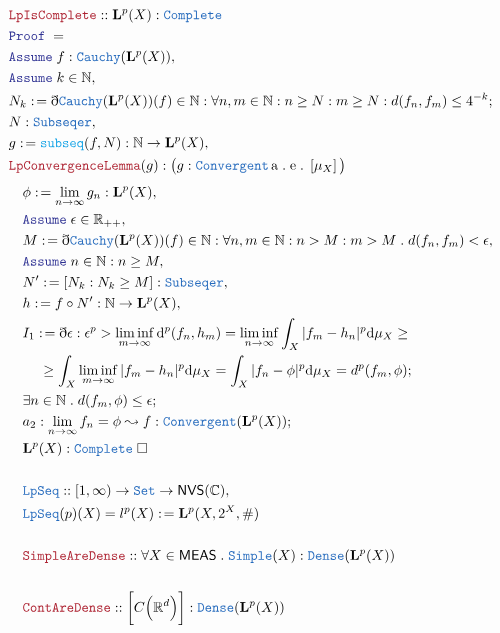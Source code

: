 \documentclass[12pt]{article}
\newcommand{\TYPE}[1]{\textcolor{NavyBlue}{\mathtt{#1}}}
\newcommand{\FUNC}[1]{\textcolor{Cerulean}{\mathtt{#1}}}
\newcommand{\LOGIC}[1]{\textcolor{Blue}{\mathtt{#1}}}
\newcommand{\THM}[1]{\textcolor{Maroon}{\mathtt{#1}}}
\renewcommand{\.}{\; . \;}
\newcommand{\de}{: \kern 0.1pc =}
\newcommand{\NewLine}{\\ & \kern 1pc}
\newcommand{\Reals}{\mathbb{R} }
\newcommand{\Nat}{\mathbb{N} }
\newcommand{\Co}{\mathbb{C} }
\newcommand{\Set}{\TYPE{Set}}
\newcommand{\A}{\LOGIC{Assume} \;}
\newcommand{\QED}{\; \square}
\newcommand{\ByDef}{\eth}
\newcommand{\Proof}{\LOGIC{Proof} \; }
\renewcommand{\AE}[1]{\mathrm{a\. e\.} \left[#1\right]}
\newcommand{\Lp}{\mathbf{L}}
\begin{document}
\begin{align*}
 \\   \\
&\THM{LpIsComplete} :: \Lp^p(X) : \TYPE{Complete} \\
&   \Proof =     \\
&   \A f : \TYPE{Cauchy}(\Lp^p(X)),\\
&    \A k \in \Nat, \\
&     N_k \de \ByDef\TYPE{Cauchy}(\Lp^p(X))(f) \in \Nat : \forall n,m \in \Nat : n \ge N : m \ge N : d(f_n,f_m) \le  4^{-k};\\
&  N : \TYPE{Subseqer}                  ,\\ 
&  g \de \FUNC{subseq}(f,N) : \Nat \to \Lp^p(X), \\
&  \THM{LpConvergenceLemma}(g) : \big( g : \TYPE{Convergent} \, \AE{\mu_X} \big) \\
\end{align*}
\newpage    
\begin{align*}
&  \phi \de \lim_{n \to \infty} g_n : \Lp^p(X),                         \\
&  \A \epsilon \in \Reals_{++},  \\
&  M \de \ByDef\TYPE{Cauchy}(\Lp^p(X))(f) \in \Nat : \forall n,m \in \Nat : n > M : m > M \. d(f_n,f_m) < \epsilon,  \\
&   \A n \in \Nat : n \ge M
,      \\
&  N' \de [N_k : N_k \ge M] : \TYPE{Subseqer}, \\
&  h \de  f \circ N' : \Nat \to \Lp^p(X), \\
& I_1 \de \ByDef\epsilon : \epsilon^p > \liminf_{m \to \infty} \mathrm d^p(f_n,h_m) =
\liminf_{n \to \infty} \int_X |f_m -h_n |^p \mathrm d \mu_X \ge 
\NewLine \ge 
\int_X \liminf_{m \to \infty} |f_m - h_n|^p \mathrm d \mu_X = \int_X |f_n - \phi |^p \mathrm d \mu_X = d^p(f_m,\phi) ; \\
& \exists  n \in \Nat \. d(f_m,\phi) \le \epsilon ;\\
& a_2 : \lim_{n \to \infty} f_n = \phi  \leadsto  f : \TYPE{Convergent}(\Lp^p(X)) ; \\
& \Lp^p(X) : \TYPE{Complete} \QED  
\\ \\
& \TYPE{LpSeq} :: [1,\infty) \to \Set \to \mathsf{NVS}(\Co), \\
& \TYPE{LpSeq}(p)(X) = l^p(X) \de \Lp^p(X,2^X,\#)     \\  
\\ 
&\THM{SimpleAreDense} :: \forall X \in \mathsf{MEAS} \. \TYPE{Simple}(X) : \TYPE{Dense}(\Lp^p(X)) 
\\ \\
&\THM{ContAreDense} ::  \bigg[C\Big(\Reals^d\Big)\bigg] : \TYPE{Dense}(\Lp^p(X)) 
\end{align*}
\newpage    
\end{document}
